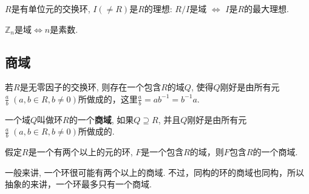 \begin{Theorem}
$R$是有单位元的交换环, $I (\neq R)$是$R$的理想: $R/I$是域 $\Leftrightarrow$
$I$是$R$的最大理想.
\end{Theorem}

\begin{Proposition}
$\mathbb{Z}_n$是域$\Leftrightarrow n$是素数. 
\end{Proposition}

\subsection{商域}

\begin{Theorem}
若$R$是无零因子的交换环, 则存在一个包含$R$的域$Q$, 使得$Q$刚好是由所有元$\displaystyle \frac{a}{b} \; (a, b \in R, b \neq \mathfrak{0} )$所做成的，这里$\displaystyle \frac{a}{b} = ab^{-1} = b^{-1}a$.
\end{Theorem}

\begin{Definition}[商域]
一个域$Q$叫做环$R$的一个\textbf{商域}, 如果$Q \supseteq R$, 并且$Q$刚好是由所有元$\displaystyle \frac{a}{b} \; (a, b \in R, b \neq 0)$所做成的.
\end{Definition}

\begin{Theorem}
假定$R$是一个有两个以上的元的环, $F$是一个包含$R$的域，则$F$包含$R$的一个商域.
\end{Theorem}

\begin{Note}
一般来讲, 一个环很可能有两个以上的商域. 不过，同构的环的商域也同构，所以抽象的来讲，一个环最多只有一个商域.
\end{Note}
